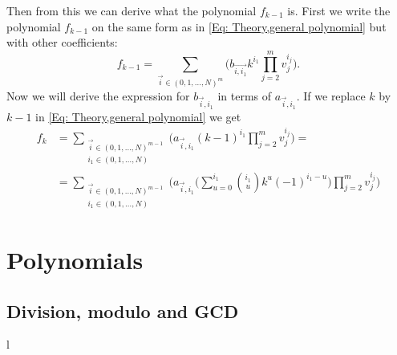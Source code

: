 Then from this we can derive what the polynomial $f_{k-1}$ is. First we write the polynomial $f_{k-1}$ on the same form as in \ref{Eq: Theory,general polynomial} but with other coefficients:
\begin{equation}\label{Eq: Theory,general polynomial k-1}
  f_{k-1} = \sum_{\vec{i}\in (0,1,\ldots,N)^m} \Big(b_\vec{i,i_1}k^{i_1}\prod_{j=2}^m v_j^{i_j}\Big).
\end{equation}
Now we will derive the expression for $b_{\vec{i},i_1}$ in terms of $a_{\vec{i},i_1}$. If we replace $k$ by $k-1$ in \ref{Eq: Theory,general polynomial} we get
\begin{equation}\label{Eq: Theory,general polynomial}
  \begin{split}
    f_k & = \sum_{\substack{\vec{i}\in (0,1,\ldots,N)^{m-1}\\i_1\in (0,1,\ldots,N)}} \Big(a_{\vec{i},i_1}(k-1)^{i_1}\prod_{j=2}^m v_j^{i_j}\Big) = \\
    & = \sum_{\substack{\vec{i}\in (0,1,\ldots,N)^{m-1}\\i_1\in (0,1,\ldots,N)}} \Big(a_{\vec{i},i_1}\Bigg(\sum_{u=0}^{i_1} \binom{i_1}{u}k^u (-1)^{i_1-u}\Bigg)\prod_{j=2}^m v_j^{i_j}\Big)
  \end{split}
\end{equation}

\section{Polynomials}

\subsection{Division, modulo and GCD}































l

